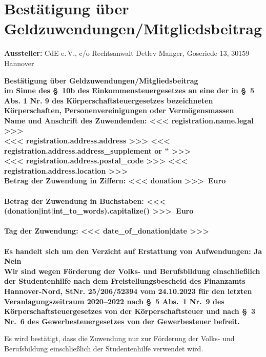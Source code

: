 \documentclass[10pt]{scrartcl}
\begin{document}
\section*{Bestätigung über Geldzuwendungen/Mitgliedsbeitrag}

\textbf{Aussteller: }CdE e.\,V., c/o Rechtsanwalt Detlev Manger, Goseriede 13, 30159 Hannover


\bfseries Bestätigung über Geldzuwendungen/Mitgliedsbeitrag\\
\mdseries im Sinne des \S \ 10b des Einkommensteuergesetzes an eine der in \S \ 5 Abs. 1 Nr. 9 des Körperschaftsteuergesetzes bezeichneten Körperschaften, Personenvereinigungen oder Vermögensmassen\\

\textbf{Name und Anschrift des Zuwendenden: }<<< registration.name.legal >>>\\
<<< registration.address.address >>> <<< registration.address.address_supplement or '' >>> \\
<<< registration.address.postal_code >>> <<< registration.address.location >>>\\


\bfseries Betrag der Zuwendung in Ziffern: \mdseries <<< donation >>>~Euro\\\\
\bfseries Betrag der Zuwendung in Buchstaben: \mdseries <<< (donation|int|int_to_words).capitalize() >>>~Euro\\\\
\bfseries Tag der Zuwendung: \mdseries <<< date_of_donation|date >>>\\\\
Es handelt sich um den Verzicht auf Erstattung von Aufwendungen: Ja \raisebox{-1pt}{\large$\square$} \quad Nein \raisebox{-1pt}{\large$\boxtimes$} \\

Wir sind wegen Förderung der Volks- und Berufsbildung einschließlich
der Studentenhilfe nach dem Freistellungsbescheid des Finanzamts
Hannover-Nord, StNr. 25/206/52394 vom 24.10.2023 für den letzten
Veranlagungszeitraum 2020--2022 nach \S~5 Abs.~1 Nr.~9 des
Körperschaftsteuergesetzes von der Körperschaftsteuer und nach \S~3
Nr.~6 des Gewerbesteuergesetzes von der Gewerbesteuer befreit.

Es wird bestätigt, dass die Zuwendung nur zur Förderung der Volks- und
Berufsbildung einschließlich der Studentenhilfe verwendet wird.
\end{document}
